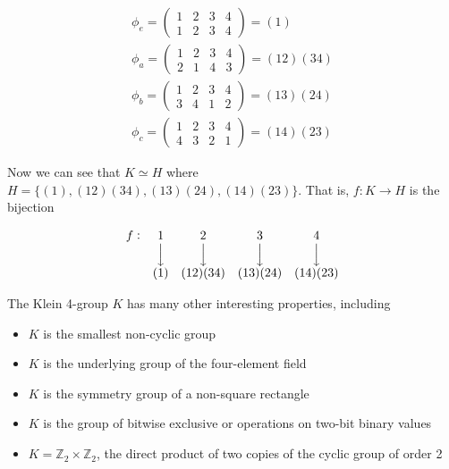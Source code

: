 \documentclass{article}
\theoremstyle{definition}
\DeclareMathOperator{\bda}{\Big \downarrow}						%
\begin{document}
\bigskip
\begin{equation*}
\begin{array}{llll}
\phi_{e} = \begin{pmatrix} 1 & 2 & 3 & 4  \\ 1 & 2 & 3 & 4  \end{pmatrix}  = (1)         \\
\phi_{a} = \begin{pmatrix} 1 & 2 & 3 & 4  \\ 2 & 1 & 4 & 3 \end{pmatrix}   = (12)(34) \\
\phi_{b} = \begin{pmatrix} 1 & 2 & 3 & 4  \\  3 & 4 & 1 & 2 \end{pmatrix}  = (13)(24)  \\
\phi_{c} = \begin{pmatrix} 1 & 2 & 3 & 4  \\  4 & 3 & 2 & 1 \end{pmatrix}   = (14)(23)                                 
\end{array} 
\end{equation*}

\bigskip
\noindent
Now we can see that $K \simeq H$ where $H = \{(1), (12)(34), (13)(24), (14)(23)\}$. That is, 
$f:K\rightarrow H$ is the bijection

\bigskip
\begin{equation*}
\begin{array}{c c c c c}
f: &  1   & 2        & 3        & 4 \\
   & \bda & \bda     & \bda     & \bda \\
   & (1)  & (12)(34) & (13)(24) &  (14)(23)
\end{array}
\end{equation*}

\bigskip
\noindent
The Klein 4-group $K$ has many other interesting properties, including

\begin{itemize}
\item $K$ is the smallest non-cyclic group
\item $K$ is the underlying group of the four-element field
\item $K$ is the symmetry group of a non-square rectangle 
\item $K$ is the group of bitwise exclusive or operations on two-bit binary values
\item $K = \mathbb{Z}_2 \times \mathbb{Z}_2$, the direct product of two copies of the cyclic group of order 2
\end{itemize}
%
%
%
\end{document}
